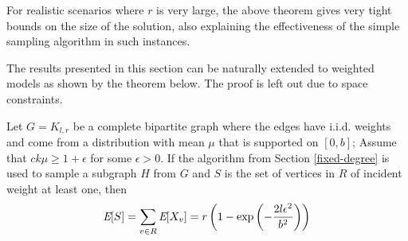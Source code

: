 
For realistic scenarios where $r$ is very large, the above theorem gives very tight bounds on the size of the solution, also explaining the effectiveness of the simple sampling algorithm in such instances.

The results presented in this section can be naturally extended to weighted models as shown by the theorem below. The proof is left out due to space constraints.

\begin{thm}
\label{wtd-thm}
Let $G=K_{l,r}$ be a complete bipartite graph where the edges have i.i.d. weights and come from a distribution with mean $\mu$ that is supported on $[0,b]$; Assume that $ck\mu \geq 1+\epsilon$ for some $\epsilon > 0$. If the algorithm from Section \ref{fixed-degree} is used to sample a subgraph $H$ from $G$ and $S$ is the set of vertices in $R$ of incident weight at least one, then
\[ \emph{\text{E}}[S] = \sum_{v\in R} \emph{\text{E}}[X_v] = r\left(1-\exp\left(-\frac{2l\epsilon^2}{b^2}\right)\right) \]
\end{thm}
